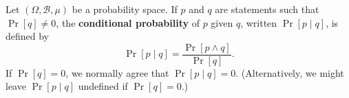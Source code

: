 Let $(\Omega, \mathcal{B}, \mu)$ be a probability space. If $p$ and $q$ are statements such that $\Pr[q] \neq 0$, the \textbf{conditional probability} of $p$ given $q$, written $\Pr[p \mid q]$, is defined by
$$\Pr[p \mid q] = \frac{\Pr[p \wedge q]}{\Pr[q]}.$$
If $\Pr[q] = 0$, we normally agree that $\Pr[p \mid q] = 0$. (Alternatively, we might leave $\Pr[p \mid q]$ undefined if $\Pr[q] = 0$.)
